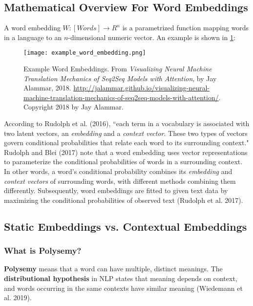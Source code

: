 \subsection{Mathematical Overview For Word Embeddings}
 
A word embedding $W: [Words] \rightarrow R^n$ is a parametrized function mapping words in a language to an $n$-dimensional numeric vector. An example is shown in \cref{fig:exampleWordEmb}:

\begin{figure}[h]
\vspace{-10pt}
\centering
\texttt{[image: example\_word\_embedding.png]}
\vspace{-10pt}
\caption{\footnotesize Example Word Embeddings. From \emph{Visualizing Neural Machine Translation Mechanics of Seq2Seq Models with Attention}, by Jay Alammar, 2018. \url{http://jalammar.github.io/visualizing-neural-machine-translation-mechanics-of-seq2seq-models-with-attention/}. Copyright 2018 by Jay Alammar.}
\vspace{-10pt}
\label{fig:exampleWordEmb}
\end{figure}

According to Rudolph et al. (2016), ``each term in a vocabulary is associated with two latent vectors, an \emph{embedding} and a \emph{context vector}. These two types of vectors govern conditional probabilities that relate each word to its surrounding context." 
Rudolph and Blei (2017) note that a word embedding uses vector representations to parameterize the conditional probabilities of words in a surrounding context. 
In other words, a word's conditional probability combines its \emph{embedding} and \emph{context vectors} of surrounding words, with different methods combining them differently. Subsequently, word embeddings are fitted to given text data by maximizing the conditional probabilities of observed text (Rudolph et al. 2017). 

\subsection{Static Embeddings vs. Contextual Embeddings} \label{sec:StaticVsContextualEmb}

\subsubsection{What is Polysemy?} \label{sec:Polysemy}

\textbf{Polysemy} means that a word can have multiple, distinct meanings. The \textbf{distributional hypothesis} in NLP states that meaning depends on context, and words occurring in the same contexts have similar meaning (Wiedemann et al. 2019). 

